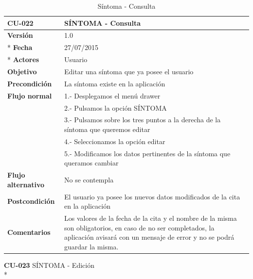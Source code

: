 \documentclass[../pfc.tex]{subfiles}
\begin{document}
	\begin{table}[H]
		\centering
		\begin{tabular}[t]{|p{3cm}|p{9.5cm}|}
			\hline \textbf{CU-022} & \textbf{SÍNTOMA - Consulta} \\*
			\hline\hline \textbf{Versión} & 1.0 \\ *
			\hline\hline \textbf{Fecha} & 27/07/2015 \\ *
			\hline\textbf{Actores} 	& Usuario\\*
			\hline \textbf{Objetivo} & Editar una síntoma que ya posee el usuario\\* 			
			\hline \textbf{Precondición} & La síntoma existe en la aplicación\\* 
			\hline \textbf{Flujo normal} & 1.- Desplegamos el menú drawer \\* 
			& 2.- Pulsamos la opción SÍNTOMA\\*	
			& 3.- Pulsamos sobre los tres puntos a la derecha de la síntoma que queremos editar\\*	
			& 4.- Seleccionamos la opción editar\\*	
			& 5.- Modificamos los datos pertinentes de la síntoma que queramos cambiar\\*	
			\hline \textbf{Flujo alternativo} & No se contempla \\* 
			\hline \textbf{Postcondición} & El usuario ya posee los nuevos datos modificados de la cita en la aplicación \\* 
			\hline \textbf{Comentarios}   & Los valores de la fecha de la cita y el nombre de la misma son obligatorios, en caso de no ser completados, la aplicación avisará con un mensaje de error y no se podrá guardar la misma.\\*
			\hline
		\end{tabular}
		\caption{Síntoma - Consulta}
		\label{tabla:caso022}
	\end{table}
	
	\textbf{CU-023}	SÍNTOMA - Edición\\*
	
\end{document}
